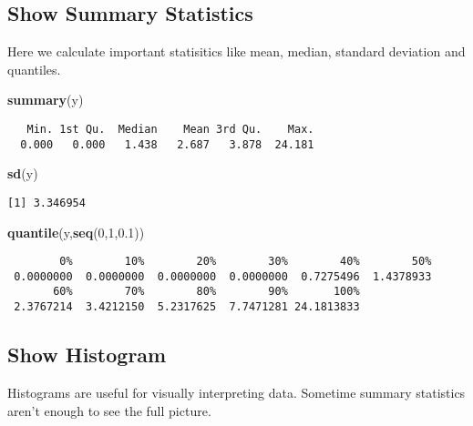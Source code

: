 \documentclass[]{book}
\newenvironment{Shaded}{\begin{snugshade}}{\end{snugshade}}
\newcommand{\KeywordTok}[1]{\textcolor[rgb]{0.13,0.29,0.53}{\textbf{#1}}}
\newcommand{\DecValTok}[1]{\textcolor[rgb]{0.00,0.00,0.81}{#1}}
\newcommand{\FloatTok}[1]{\textcolor[rgb]{0.00,0.00,0.81}{#1}}
\newcommand{\NormalTok}[1]{#1}
\theoremstyle{definition}
\theoremstyle{definition}
\theoremstyle{definition}
\theoremstyle{remark}
\begin{document}
\subsection{Show Summary Statistics}\label{show-summary-statistics}

Here we calculate important statisitics like mean, median, standard
deviation and quantiles.

\begin{Shaded}
\begin{Highlighting}[]
\KeywordTok{summary}\NormalTok{(y)}
\end{Highlighting}
\end{Shaded}

\begin{verbatim}
   Min. 1st Qu.  Median    Mean 3rd Qu.    Max. 
  0.000   0.000   1.438   2.687   3.878  24.181 
\end{verbatim}

\begin{Shaded}
\begin{Highlighting}[]
\KeywordTok{sd}\NormalTok{(y)}
\end{Highlighting}
\end{Shaded}

\begin{verbatim}
[1] 3.346954
\end{verbatim}

\begin{Shaded}
\begin{Highlighting}[]
\KeywordTok{quantile}\NormalTok{(y,}\KeywordTok{seq}\NormalTok{(}\DecValTok{0}\NormalTok{,}\DecValTok{1}\NormalTok{,}\FloatTok{0.1}\NormalTok{))}
\end{Highlighting}
\end{Shaded}

\begin{verbatim}
        0%        10%        20%        30%        40%        50% 
 0.0000000  0.0000000  0.0000000  0.0000000  0.7275496  1.4378933 
       60%        70%        80%        90%       100% 
 2.3767214  3.4212150  5.2317625  7.7471281 24.1813833 
\end{verbatim}

\subsection{Show Histogram}\label{show-histogram}

Histograms are useful for visually interpreting data. Sometime summary
statistics aren't enough to see the full picture.
\end{document}
